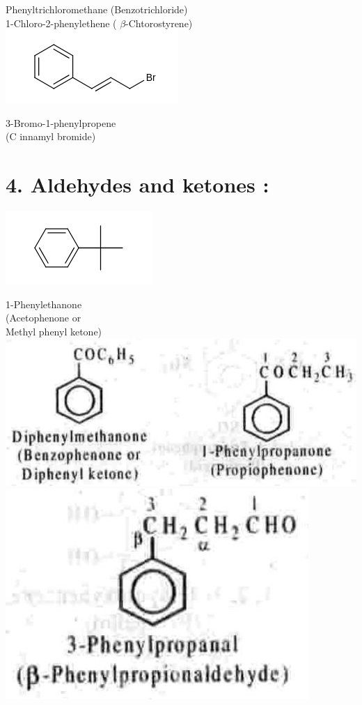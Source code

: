 \documentclass[10pt]{article}
\begin{document}
Phenyltrichloromethane (Benzotrichloride)\\


1-Chloro-2-phenylethene ( $\beta$-Chtorostyrene)\\
\includegraphics{smile-8a1d5fca17be80aa5bb909b9daa1a4f2e1c03c05}

3-Bromo-1-phenylpropene\\
(C innamyl bromide)

\section*{4. Aldehydes and ketones :}
\includegraphics{smile-e210b175338ccf10cb64095cb89b39f6e901daeb}

1-Phenylethanone\\
(Acetophenone or\\
Methyl phenyl ketone)\\
\includegraphics[max width=\textwidth, center]{2025_01_28_8470952b98110cec3aabg-030}\\
\includegraphics[max width=\textwidth, center]{2025_01_28_8470952b98110cec3aabg-030(1)}
\end{document}
